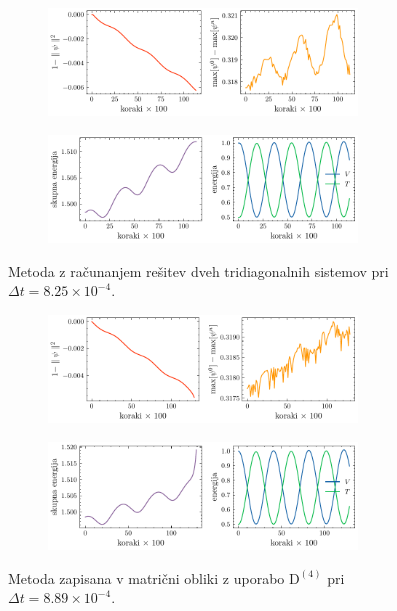 \documentclass[11pt]{report}
\newcommand{\D}{\text{D}}
\begin{document}
\begin{figure}[h!]
	\centering
	\begin{subfigure}[b]{\textwidth}
		\centering
		\includegraphics[width=0.9\textwidth]{norm_max_tridiag_adi.pdf}
		\label{fig: < >}
	\end{subfigure}
	\hfill
	\begin{subfigure}[b]{1\textwidth}
		\centering
		\includegraphics[width=0.9\textwidth]{E_tridiag_adi.pdf}
		\label{fig: < >}
	\end{subfigure}
	\caption{Metoda z računanjem rešitev dveh tridiagonalnih sistemov pri $\Delta t=8.25 \times 10^{-4}$.}
	\label{fig: 2}
\end{figure}

\begin{figure}[h!]
	\centering
	\begin{subfigure}[b]{\textwidth}
		\centering
		\includegraphics[width=0.9\textwidth]{norm_max_sparse_adi.pdf}
		\label{fig: < >}
	\end{subfigure}
	\hfill
	\begin{subfigure}[b]{\textwidth}
		\centering
		\includegraphics[width=0.9\textwidth]{E_sparse_adi.pdf}
		\label{fig: < >}
	\end{subfigure}
	\caption{Metoda zapisana v matrični obliki z uporabo $\D^{(4)}$ pri $\Delta t=8.89 \times 10^{-4}$.}
	\label{fig: 3}
\end{figure}
\end{document}
